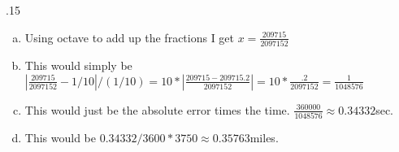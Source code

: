 \documentclass[12pt]{article}
\makeatletter
\theoremstyle{homework}
\newenvironment{exercise}[1]
{\def\@currentlabel{#1}\exercisecore}
{\endexercisecore}
\makeatother
\begin{document}
\begin{exercise}

5.15\\
\end{exercise}
\begin{enumerate}[(a)]
\item
Using octave to add up the fractions I get
$x=\frac{209715}{2097152}$
\item
This would simply be $|\frac{209715}{2097152}-1/10|/(1/10)=10*|\frac{209715-209715.2}{2097152}|=10*\frac{.2}{2097152}=\frac{1}{1048576}$
\item
This would just be the absolute error times the time.  $\frac{360000}{1048576}\approx 0.34332$sec.
\item
This would be $0.34332/3600*3750\approx 0.35763$miles.

\end{enumerate}
\end{document}
